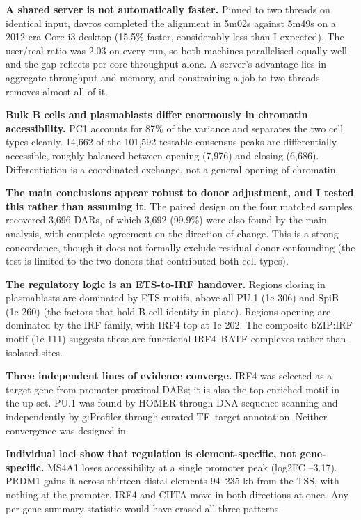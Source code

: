 \documentclass[
  11pt,
  a4paper,
]{article}
\begin{document}
\textbf{A shared server is not automatically faster.} Pinned to two
threads on identical input, davros completed the alignment in 5m02s
against 5m49s on a 2012-era Core i3 desktop (15.5\% faster, considerably
less than I expected). The user/real ratio was 2.03 on every run, so
both machines parallelised equally well and the gap reflects per-core
throughput alone. A server's advantage lies in aggregate throughput and
memory, and constraining a job to two threads removes almost all of it.

\textbf{Bulk B cells and plasmablasts differ enormously in chromatin
accessibility.} PC1 accounts for 87\% of the variance and separates the
two cell types cleanly. 14,662 of the 101,592 testable consensus peaks
are differentially accessible, roughly balanced between opening (7,976)
and closing (6,686). Differentiation is a coordinated exchange, not a
general opening of chromatin.

\textbf{The main conclusions appear robust to donor adjustment, and I
tested this rather than assuming it.} The paired design on the four
matched samples recovered 3,696 DARs, of which 3,692 (99.9\%) were also
found by the main analysis, with complete agreement on the direction of
change. This is a strong concordance, though it does not formally
exclude residual donor confounding (the test is limited to the two
donors that contributed both cell types).

\textbf{The regulatory logic is an ETS-to-IRF handover.} Regions closing
in plasmablasts are dominated by ETS motifs, above all PU.1 (1e-306) and
SpiB (1e-260) (the factors that hold B-cell identity in place). Regions
opening are dominated by the IRF family, with IRF4 top at 1e-202. The
composite bZIP:IRF motif (1e-111) suggests these are functional
IRF4--BATF complexes rather than isolated sites.

\textbf{Three independent lines of evidence converge.} IRF4 was selected
as a target gene from promoter-proximal DARs; it is also the top
enriched motif in the up set. PU.1 was found by HOMER through DNA
sequence scanning and independently by g:Profiler through curated
TF--target annotation. Neither convergence was designed in.

\textbf{Individual loci show that regulation is element-specific, not
gene-specific.} MS4A1 loses accessibility at a single promoter peak
(log2FC --3.17). PRDM1 gains it across thirteen distal elements 94--235
kb from the TSS, with nothing at the promoter. IRF4 and CIITA move in
both directions at once. Any per-gene summary statistic would have
erased all three patterns.
\end{document}
